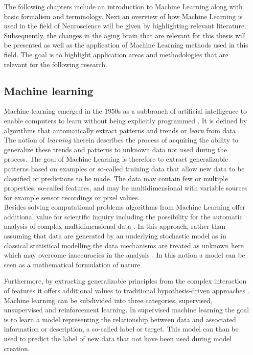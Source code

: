 The following chapters include an introduction to Machine Learning along with basic formalism and terminology. Next an overview of how Machine Learning is used in the field of Neuroscience will be given by highlighting relevant literature. Subsequently, the changes in the aging brain that are relevant for this thesis will be presented as well as the application of Machine Learning methods used in this field. The goal is to highlight application areas and methodologies that are relevant for the following research.  

\subsection{Machine learning}
\label{subsec:ML}
Machine learning emerged in the 1950s as a subbranch of artificial intelligence to enable computers to learn without being explicitly programmed \cite{Samual1959}. It is defined by algorithms that automatically extract patterns and trends or \textit{learn} from data \cite{Hastie2009}. The notion of \textit{learning} therein describes the process of acquiring the ability to generalize these trends and patterns to unknown data not used during the process. The goal of Machine Learning is therefore to extract generalizable patterns based on examples or so-called training data that allow new data to be classified or predictions to be made. The data may contain few or multiple properties, so-called features, and may be multidimensional with variable sources for example sensor recordings or pixel values.\\ Besides solving computational problems algorithms from Machine Learning offer additional value for scientific inquiry including the possibility for the automatic analysis of complex multidimensional data \cite{Brunton2019,Breiman2001}. In this approach, rather than assuming that data are generated by an underlying stochastic model as in classical statistical modelling the data mechanisms are treated as unknown here which may overcome inaccuracies in the analysis \cite{Breiman2001}. In this notion a model can be seen as a mathematical formulation of nature 

Furthermore, by extracting generalizable principles from the complex interaction of features it offers additional values to traditional hypothesis-driven approaches \cite{Vu1601,Bzdok2017}. \medskip\\
Machine learning can be subdivided into three categories, supervised, unsupervised and reinforcement learning. In supervised machine learning the goal is to learn a model representing the relationship between data and associated information or description, a so-called label or target.  
This model can than be used to predict the label of new data that not have been used during model creation. 


